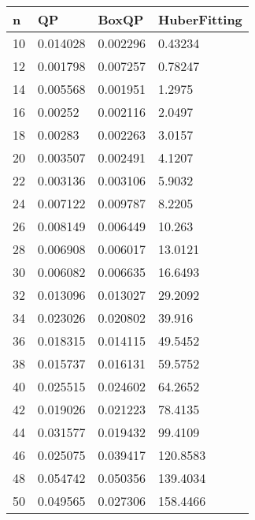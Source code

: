 \begin{tabular}{llll}
n & QP & BoxQP & HuberFitting \\ 
\hline 
10 & 0.014028 & 0.002296 & 0.43234 \\ 
12 & 0.001798 & 0.007257 & 0.78247 \\ 
14 & 0.005568 & 0.001951 & 1.2975 \\ 
16 & 0.00252 & 0.002116 & 2.0497 \\ 
18 & 0.00283 & 0.002263 & 3.0157 \\ 
20 & 0.003507 & 0.002491 & 4.1207 \\ 
22 & 0.003136 & 0.003106 & 5.9032 \\ 
24 & 0.007122 & 0.009787 & 8.2205 \\ 
26 & 0.008149 & 0.006449 & 10.263 \\ 
28 & 0.006908 & 0.006017 & 13.0121 \\ 
30 & 0.006082 & 0.006635 & 16.6493 \\ 
32 & 0.013096 & 0.013027 & 29.2092 \\ 
34 & 0.023026 & 0.020802 & 39.916 \\ 
36 & 0.018315 & 0.014115 & 49.5452 \\ 
38 & 0.015737 & 0.016131 & 59.5752 \\ 
40 & 0.025515 & 0.024602 & 64.2652 \\ 
42 & 0.019026 & 0.021223 & 78.4135 \\ 
44 & 0.031577 & 0.019432 & 99.4109 \\ 
46 & 0.025075 & 0.039417 & 120.8583 \\ 
48 & 0.054742 & 0.050356 & 139.4034 \\ 
50 & 0.049565 & 0.027306 & 158.4466 \\ 
\hline 
\end{tabular}
